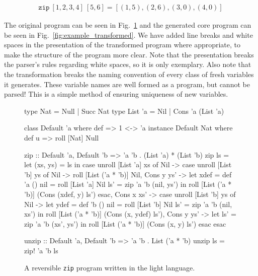\begin{align*}
  \texttt{zip}~[1, 2, 3, 4]~[5,6] = [(1, 5), (2, 6), (3, 0), (4, 0)]
\end{align*}

The original program can be seen in Fig.~\ref{fig:example_light} and the
generated core program can be seen in Fig.~\ref{fig:example_transformed}. We
have added line breaks and white spaces in the presentation of the transformed
program where appropriate, to make the structure of the program more clear.
Note that the presentation breaks the parser's rules regarding white spaces, so
it is only exemplary. Also note that the transformation breaks the naming
convention of every class of fresh variables it generates. These variable names
are well formed as a program, but cannot be parsed! This is a simple method of
ensuring uniqueness of new variables.

\begin{figure}[ht!]
  \begin{rfuncode}
type Nat = Null | Succ Nat
type List 'a = Nil | Cons 'a (List 'a)

class Default 'a where
  def => 1 <-> 'a
instance Default Nat where
  def u => roll [Nat] Null

zip :: Default 'a, Default 'b => 'a 'b . (List 'a) * (List 'b)
zip ls = let (xs, ys) = ls
            in case unroll [List 'a] xs of
              Nil -> case unroll [List 'b] ys of
                Nil -> roll [List ('a * 'b)] Nil,
                Cons y ys' -> let xdef = def 'a ()
                                  nil = roll [List 'a] Nil
                                  ls' = zip 'a 'b (nil, ys')
                              in roll [List ('a * 'b)] (Cons (xdef, y) ls')
                esac,
              Cons x xs' -> case unroll [List 'b] ys of
                Nil -> let ydef = def 'b ()
                           nil = roll [List 'b] Nil
                           ls' = zip 'a 'b (nil, xs')
                       in roll [List ('a * 'b)] (Cons (x, ydef) ls'),
                Cons y ys' -> let ls' = zip 'a 'b (xs', ys')
                              in roll [List ('a * 'b)] (Cons (x, y) ls')
                esac
            esac

unzip :: Default 'a, Default 'b => 'a 'b . List ('a * 'b)
unzip ls = zip! 'a 'b ls
  \end{rfuncode}
  \caption{A reversible \texttt{zip} program written in the light
  language.}\label{fig:example_light}
\end{figure}

